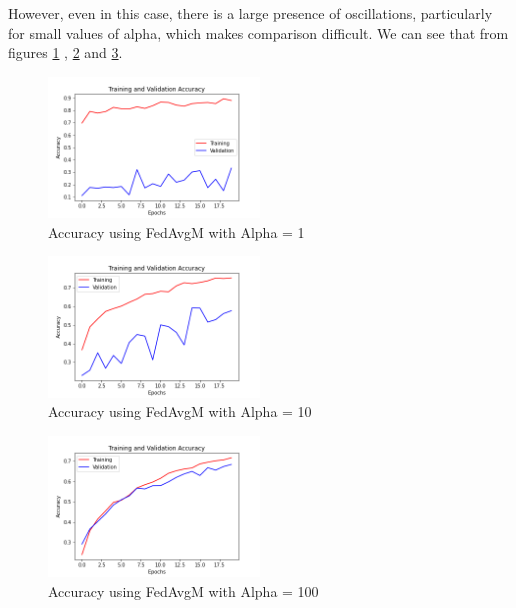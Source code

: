 \documentclass[twocolumn]{article}
\begin{document}
However, even in this case, there is a large presence of oscillations, particularly for small values of alpha, which makes comparison difficult.
We can see that from figures \ref{AccFedAvgMA1} , \ref{AccFedAvgMA10} and \ref{AccFedAvgMA100}.


\begin{figure}
    \centering
    \includegraphics[width=0.5\textwidth,height=.3\textheight]{7_AccuracyFedAvgM_A1.png}
    \caption{Accuracy using FedAvgM with Alpha = 1}
     \label{AccFedAvgMA1} 
\end{figure}

\begin{figure}
    \centering
    \includegraphics[width=0.5\textwidth,height=.3\textheight]{7_AccuracyFedAvgM_A10.png}
    \caption{Accuracy using FedAvgM with Alpha = 10}
     \label{AccFedAvgMA10} 
\end{figure}

\begin{figure}
    \centering
    \includegraphics[width=0.5\textwidth,height=.3\textheight]{7_AccuracyFedAvgM_A100.png}
    \caption{Accuracy using FedAvgM with Alpha = 100}
     \label{AccFedAvgMA100} 
\end{figure}
\end{document}
